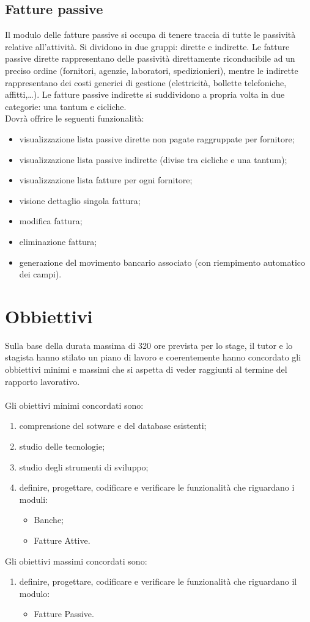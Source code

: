 	\subsection{Fatture passive}
	Il modulo delle fatture passive si occupa di tenere traccia di tutte le passività relative
	all’attività. Si dividono in due gruppi: dirette e indirette. Le fatture passive dirette rappresentano
	delle passività direttamente riconducibile ad un preciso ordine (fornitori, agenzie, laboratori,
	spedizionieri), mentre le indirette rappresentano dei costi generici di gestione (elettricità,
	bollette telefoniche, affitti,…). Le fatture passive indirette si suddividono a propria volta in
	due categorie: una tantum e cicliche. \\
	Dovrà offrire le seguenti funzionalità:
	\begin{itemize}
		\item visualizzazione lista passive dirette non pagate raggruppate per fornitore;
		\item visualizzazione lista passive indirette (divise tra cicliche e una tantum);
		\item visualizzazione lista fatture per ogni fornitore;
		\item visione dettaglio singola fattura;
		\item modifica fattura;
		\item eliminazione fattura;
		\item generazione del movimento bancario associato (con riempimento automatico dei campi).
	\end{itemize}	

\section{Obbiettivi}
Sulla base della durata massima di 320 ore prevista per lo stage, il tutor e lo stagista hanno
stilato un piano di lavoro e coerentemente hanno concordato gli obbiettivi minimi e massimi che si aspetta di veder raggiunti al termine del
rapporto lavorativo.
\\ \\
Gli obiettivi minimi concordati sono:
\begin{enumerate}
	\item comprensione del sotware e del database esistenti;
	\item studio delle tecnologie;
	\item studio degli strumenti di sviluppo;
	\item definire, progettare, codificare e verificare le funzionalità che riguardano i moduli:
		\begin{itemize}
			\item Banche;
			\item Fatture Attive.
		\end{itemize}
\end{enumerate}

Gli obiettivi massimi concordati sono:
\begin{enumerate}
	\item definire, progettare,  codificare e verificare le funzionalità che riguardano il modulo:
	\begin{itemize}
		\item Fatture Passive.
	\end{itemize}
\end{enumerate}
